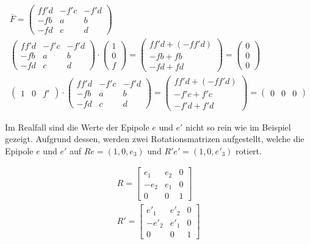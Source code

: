 \begin{gather}
	\bar{F} = \begin{pmatrix}
	ff'd&-f'c&-f'd\\
	-fb&a&b\\
	-fd&c&d
	\end{pmatrix}\\
	\begin{pmatrix}
	ff'd&-f'c&-f'd\\
	-fb&a&b\\
	-fd&c&d
	\end{pmatrix} \cdot \begin{pmatrix}
	1\\0\\f
	\end{pmatrix} = 
	\begin{pmatrix}
	ff'd + (-ff'd)\\
	-fb + fb\\
	-fd +fd
	\end{pmatrix}
	= 
	\begin{pmatrix}
	0\\0\\0
	\end{pmatrix}\\
	\begin{pmatrix}
	1&0&f'
	\end{pmatrix} \cdot
	\begin{pmatrix}
	ff'd&-f'c&-f'd\\
	-fb&a&b\\
	-fd&c&d
	\end{pmatrix} =
	\begin{pmatrix}
	ff'd + (-ff'd)\\
	-f'c + f'c\\
	-f'd + f'd
	\end{pmatrix} = 
		\begin{pmatrix}
	0&0&0
	\end{pmatrix}
\end{gather}

Im Realfall sind die Werte der Epipole $e$ und $e'$ nicht so rein wie im Beispiel gezeigt. Aufgrund dessen, werden zwei Rotationsmatrizen aufgestellt, welche die Epipole $e$ und $e'$ auf $Re = (1,0,e_3)$ und $R'e' = (1,0,e'_3)$ rotiert.

\begin{gather}
	R = \begin{bmatrix}
		e_1&e_2&0\\
		-e_2&e_1&0\\
		0&0&1
	\end{bmatrix}\\
	R' = \begin{bmatrix}
	e'_1&e'_2&0\\
	-e'_2&e'_1&0\\
	0&0&1
\end{bmatrix}
\end{gather}\\


